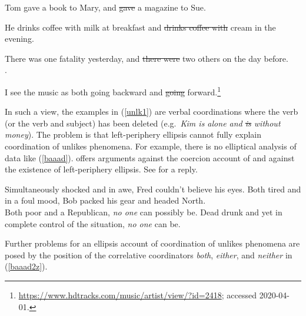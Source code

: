 {\begin{exe}
\ex
\begin{xlista}
\ex Tom gave a book to Mary, and \sout{gave} a magazine to Sue.\\\citep[]{Chaves2013b-u} 

\ex He drinks coffee with milk at breakfast and \sout{drinks coffee with} cream in the evening.\\ \citep[]{hudson84}

\ex There was one fatality yesterday, and \sout{there were} two others on the day
before.\\
\citep[339]{chavesthesis}.

\ex I see the music as both going backward and \sout{going} forward.\footnote{
\url{https://www.hdtracks.com/music/artist/view/?id=2418}; accessed 2020-04-01.}
\end{xlista}\label{unlk}
\end{exe}

\noindent
In such a view, the examples in (\ref{unlk1})  are verbal coordinations where the verb (or the verb and subject) has been deleted  (e.g.\ \emph{Kim is alone and \sout{is} without money}).  The problem is that  left-periphery ellipsis  cannot  fully explain 
coordination of unlikes phenomena. For example, there is no elliptical analysis of  data like (\ref{baaad}). \citet{levine11} offers  arguments against
the coercion account of \citet{chaves06}
and against  the existence of left-periphery ellipsis. See \cite{yatabe12} for a reply.

\begin{exe}
\ex
\begin{xlista}
\ex Simultaneously shocked and in awe, Fred couldn't believe his eyes.
\citep[]{Chaves2013b-u}
\ex  Both tired and in a foul mood, Bob packed his gear and headed North.\\
\citep[]{chaves06}
\ex Both poor and a Republican, \emph{no one} can possibly be.
\citep[]{Chaves2013b-u}
\ex  Dead drunk and yet in complete control of the situation, \emph{no one} can be.
\citep[]{levine11}
\end{xlista}\label{baaad}
\end{exe}



\noindent
Further problems for an  ellipsis account of coordination
of unlikes phenomena are posed by the position of  the 
correlative coordinators \emph{both}, \emph{either}, and
 \emph{neither} in (\ref{baaad2z}).

}
